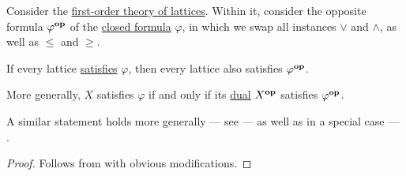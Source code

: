 \begin{theorem}\label{thm:lattice_duality}
  Consider the \hyperref[def:lattice/theory]{first-order theory of lattices}. Within it, consider the opposite formula \( \varphi^\oppos \) of the \hyperref[def:first_order_syntax/closed_formula]{closed formula} \( \varphi \), in which we swap all instances \( \vee \) and \( \wedge \), as well as \( \leq \) and \( \geq \).

  If every lattice \hyperref[def:first_order_model]{satisfies} \( \varphi \), then every lattice also satisfies \( \varphi^\oppos \).

  More generally, \( X \) satisfies \( \varphi \) if and only if its \hyperref[def:lattice/opposite]{dual} \( X^\oppos \) satisfies \( \varphi^\oppos \).
\end{theorem}
\begin{comments}
  \item A similar statement holds more generally --- see  --- as well as in a special case --- .
\end{comments}
\begin{proof}
  Follows from  with obvious modifications.
\end{proof}

